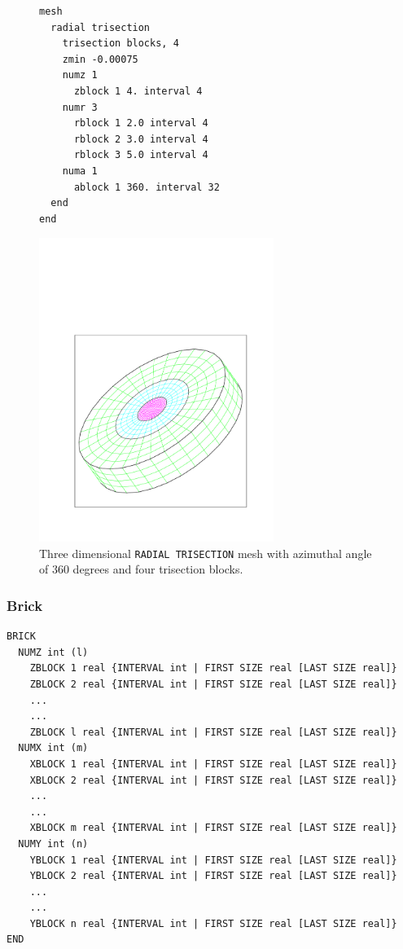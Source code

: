 \begin{figure}[htbp]
\centering
  \begin{minipage}[c]{0.4\linewidth}
    \centering
{\ttfamily \begin{verbatim}
mesh
  radial trisection
    trisection blocks, 4
    zmin -0.00075
    numz 1
      zblock 1 4. interval 4
    numr 3 
      rblock 1 2.0 interval 4
      rblock 2 3.0 interval 4
      rblock 3 5.0 interval 4
    numa 1
      ablock 1 360. interval 32
  end
end
\end{verbatim}}
  \end{minipage}%
  \hfil
  \begin{minipage}[c]{0.6\linewidth}
    \centering
      \includegraphics[width=3.0in]{cubit_radial_trisection2}
  \end{minipage}
  \caption [A 360 degree \texttt{RADIAL TRISECTION} mesh.] {Three dimensional \texttt{RADIAL TRISECTION} mesh with azimuthal
    angle of 360 degrees and four trisection blocks.}
  \label{fig:cubit_radial_trisect2}
\end{figure}


\clearpage
\subsubsection {Brick}

{\ttfamily \begin{verbatim}
BRICK
  NUMZ int (l)
    ZBLOCK 1 real {INTERVAL int | FIRST SIZE real [LAST SIZE real]}
    ZBLOCK 2 real {INTERVAL int | FIRST SIZE real [LAST SIZE real]}
    ...
    ...
    ZBLOCK l real {INTERVAL int | FIRST SIZE real [LAST SIZE real]}
  NUMX int (m)
    XBLOCK 1 real {INTERVAL int | FIRST SIZE real [LAST SIZE real]}
    XBLOCK 2 real {INTERVAL int | FIRST SIZE real [LAST SIZE real]}
    ...
    ...
    XBLOCK m real {INTERVAL int | FIRST SIZE real [LAST SIZE real]}
  NUMY int (n)
    YBLOCK 1 real {INTERVAL int | FIRST SIZE real [LAST SIZE real]}
    YBLOCK 2 real {INTERVAL int | FIRST SIZE real [LAST SIZE real]}
    ...
    ...
    YBLOCK n real {INTERVAL int | FIRST SIZE real [LAST SIZE real]}
END
\end{verbatim}
}

